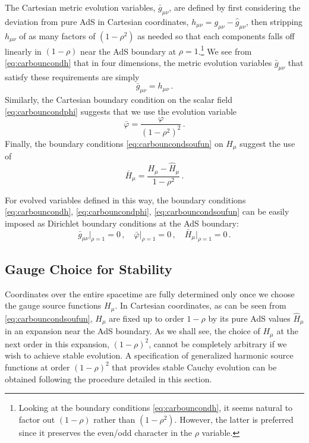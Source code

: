 \documentclass[a4paper,11pt]{article}
\numberwithin{equation}{section}
\begin{document}
The Cartesian metric evolution variables, $\bar{g}_{\mu\nu}$, are defined by first considering the deviation from pure AdS in Cartesian coordinates, $h_{\mu\nu}=g_{\mu\nu}-\hat{g}_{\mu\nu}$, then stripping $h_{\mu\nu}$ of as many factors of $(1-\rho^2)$ as needed so that each components falls off linearly in $(1-\rho)$ near the AdS boundary at $\rho=1$.\footnote{Looking at the boundary conditions \eqref{eq:carbouncondh}, it seems natural to factor out $(1-\rho)$ rather than $(1-\rho^2)$. However, the latter is preferred since it preserves the even/odd character in the $\rho$ variable.}
We see from \eqref{eq:carbouncondh} that in four dimensions, the metric evolution variables $\bar{g}_{\mu\nu}$ that satisfy these requirements are simply 
\begin{equation}\label{eq:gbarcart}
\bar{g}_{\mu\nu}=h_{\mu\nu}\,.
\end{equation}
Similarly, the Cartesian boundary condition on the scalar field \eqref{eq:carbouncondphi} suggests that we use the evolution variable
\begin{equation}
\label{eq:phibarcart}
\bar{\varphi}=\frac{\varphi }{(1-\rho^2)^2}\,.
\end{equation}
Finally, the boundary conditions \eqref{eq:carbouncondsoufun} on $H_\mu$ suggest the use of
\begin{equation}\label{eq:soufunb}
\bar{H}_\mu=\frac{H_\mu-\hat{H}_\mu}{1-\rho^2 }\,.
\end{equation}

For evolved variables defined in this way, the boundary conditions \eqref{eq:carbouncondh}, \eqref{eq:carbouncondphi}, \eqref{eq:carbouncondsoufun} can be easily imposed as Dirichlet boundary conditions at the AdS boundary:
\begin{equation}
\label{eq:dirbc}
 \bar{g}_{\mu\nu}\big|_{\rho=1}=0\,,\quad \bar{\varphi}\big|_{\rho=1}=0\,,\quad \bar{H}_\mu\big|_{\rho=1}=0\,.
 \end{equation}



\subsection{Gauge Choice for Stability}\label{sec:gauge_choice}

Coordinates over the entire spacetime are fully determined only once we choose the gauge source functions $H_\mu$. 
In Cartesian coordinates, as can be seen from \eqref{eq:carbouncondsoufun}, $H_\mu$ are fixed up to order $1-\rho$ by its pure AdS values $\hat{H}_\mu$ in an expansion near the AdS boundary.
As we shall see, the choice of $H_\mu$ at the next order in this expansion, $(1-\rho)^2$, cannot be completely arbitrary if we wish to achieve stable evolution.
A specification of generalized harmonic source functions at order $(1-\rho)^2$ that provides stable Cauchy evolution can be obtained following the procedure detailed in this section.
\end{document}
